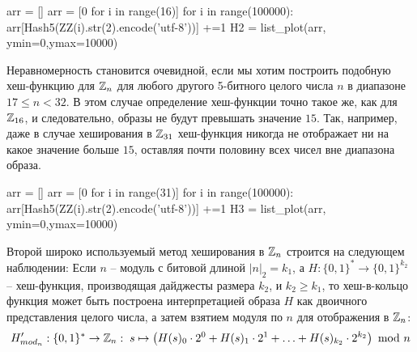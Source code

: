 \begin{example}
\begin{sagesilent}
arr = []
arr = [0 for i in range(16)]
for i in range(100000):
    arr[Hash5(ZZ(i).str(2).encode('utf-8'))] +=1
H2 = list_plot(arr, ymin=0,ymax=10000)
\end{sagesilent}
\begin{center}
\end{center}
Неравномерность становится очевидной, если мы хотим построить подобную хеш-функцию для $\mathbb{Z}_n$ для любого другого 5-битного целого числа $n$ в диапазоне $17\leq n < 32$. В этом случае определение хеш-функции точно такое же, как для $\mathbb{Z}_{16}$, и следовательно, образы не будут превышать значение $15$. Так, например, даже в случае хеширования в $\mathbb{Z}_{31}$ хеш-функция никогда не отображает ни на какое значение больше $15$, оставляя почти половину всех чисел вне диапазона образа.
\begin{sagesilent}
arr = []
arr = [0 for i in range(31)]
for i in range(100000):
    arr[Hash5(ZZ(i).str(2).encode('utf-8'))] +=1
H3 = list_plot(arr, ymin=0,ymax=10000)
\end{sagesilent}
\begin{center}
\end{center}
\end{example}


Второй широко используемый метод хеширования в $\mathbb{Z}_n$ строится на следующем наблюдении: Если $n$ -- модуль с битовой длиной $|n|_2=k_1$, а $H:\{0,1\}^*\to \{0,1\}^{k_2}$ -- хеш-функция, производящая дайджесты размера $k_2$, и $k_2\geq k_1$, то хеш-в-кольцо функция может быть построена интерпретацией образа $H$ как двоичного представления целого числа, а затем взятием модуля по $n$ для отображения в $\mathbb{Z}_n$:
\begin{equation}
H'_{mod_n}: \{0,1\}^* \to \mathbb{Z}_n: \; s \mapsto
\left(H(s)_0\cdot 2^0 + H(s)_1\cdot 2^1 + \ldots + H(s)_{k_2}\cdot 2^{k_2}\right) \text{ mod } n
\end{equation}

